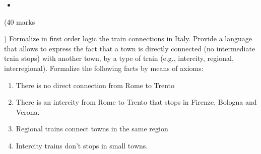 \begin{sol}
\begin{itemize}
  \item 
\end{itemize}
\end{sol}

\begin{problem}(40 marks\addtocounter{marks}{40})%
Formalize in first order logic the train connections in Italy. Provide a language that allows to express the fact that a town is directly connected (no intermediate train stops) with another town, by a type of train (e.g., intercity, regional, interregional). Formalize the following facts by means of axioms:

\begin{enumerate}
  \item There is no direct connection from Rome to Trento
  \item There is an intercity from Rome to Trento that stops in Firenze, Bologna and Verona.
  \item Regional trains connect towns in the same region
  \item Intercity trains don't stops in small towns.
\end{enumerate}

\end{problem}
